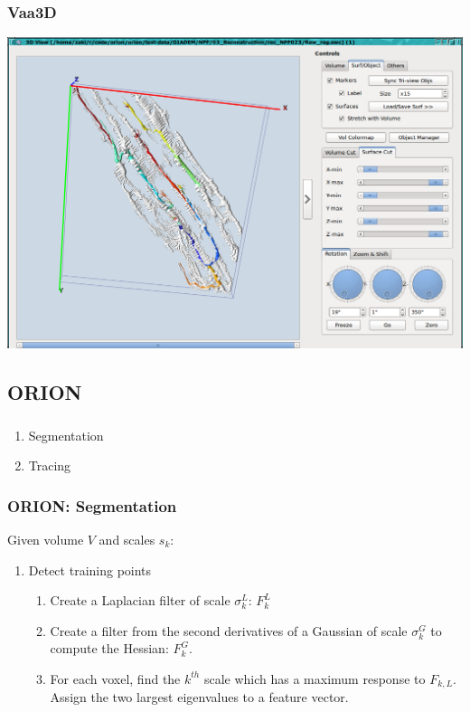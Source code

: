 \documentclass{beamer}
\begin{document}
\begin{frame}\frametitle{Vaa3D}
	\centering
	\includegraphics[height=0.5\textheight]{gfx/present/vaa3d-load-swc}
\end{frame}

\subsection{ORION}
\begin{frame}\frametitle{\subsecname}
	\begin{enumerate}
		\def\labelenumi{\arabic{enumi}.}
		\item Segmentation
		\item Tracing
	\end{enumerate}
\end{frame}

\begin{frame}\frametitle{ORION: Segmentation}
	Given volume \(V\) and scales \(s_{k}\):
	\begin{enumerate}
		\def\labelenumi{\arabic{enumi}.}
		\item Detect training points
		\begin{enumerate}
			\def\labelenumii{\arabic{enumii}.}
			\item Create a Laplacian filter of scale \(\sigma_{k}^{L}\): \(F_{k}^{L}\)
			\item Create a filter from the second
				derivatives of a Gaussian of scale
				\(\sigma_{k}^{G}\) to compute the
				Hessian: \(F_{k}^{G}\).
			\item For each voxel, find the \(k^{th}\) scale which has
				a maximum response to \(F_{k,L}\).
				Assign the two largest eigenvalues
				to a feature vector.
		\end{enumerate}
	\end{enumerate}
\end{frame}
\end{document}
